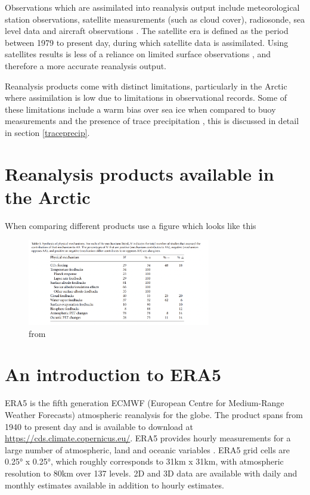 \documentclass[12pt, oneside]{article}
\begin{document}
Observations which are assimilated into reanalysis output include meteorological station observations, satellite measurements (such as cloud cover), radiosonde, sea level data and aircraft observations \cite{gelaro2017modern}. The satellite era is defined as the period between 1979 to present day, during which satellite data is assimilated. Using satellites results is less of a reliance on limited surface observations \cite{knutson2006assessment}, and therefore a more accurate reanalysis output.


Reanalysis products come with distinct limitations, particularly in the Arctic where assimilation is low due to limitations in observational records. Some of these limitations include a warm bias over sea ice when compared to buoy measurements \cite{wang2019comparison} and the presence of trace precipitation \cite{boisvert2018intercomparison}, this is discussed in detail in section \ref{traceprecip}.


\section{Reanalysis products available in the Arctic}

When comparing different products use a figure which looks like this 

\begin{figure}[ht]
    \centering
    \vspace{-4mm}
    \includegraphics[width=80mm]{previdi_comparasion_mechanisms.png}
    \vspace{-4mm}
    \caption{from \cite{previdi2021arctic} }
    \label{f:previdi2021arctic}
\end{figure}




\section{An introduction to ERA5}
ERA5 is the fifth generation ECMWF (European Centre for Medium-Range Weather Forecasts) atmospheric reanalysis for the globe. The product spans from 1940 to present day and is available to download at \url{https://cds.climate.copernicus.eu/}. ERA5 provides hourly measurements for a large number of atmospheric, land and oceanic variables \cite{hersbach2020era5}. 
ERA5 grid cells are 0.25° x 0.25°, which roughly corresponds to 31km x 31km, with atmospheric resolution to 80km over 137 levels. 2D and 3D data are available with daily and monthly estimates available in addition to hourly estimates. 
\end{document}
